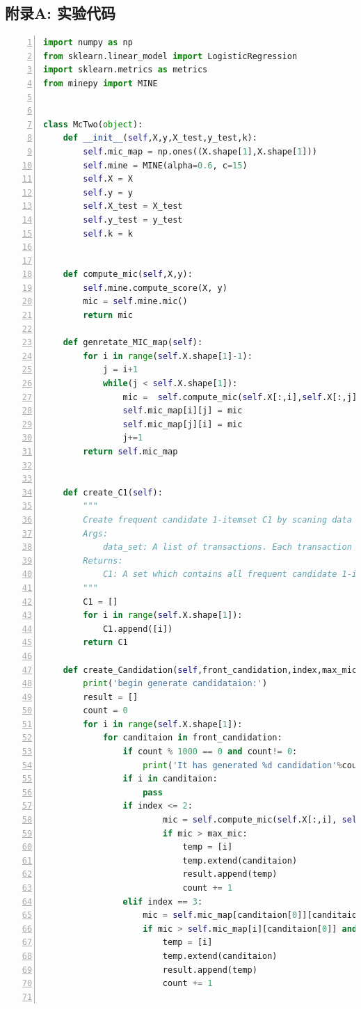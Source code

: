 \documentclass{njubachelor}
\begin{document}
\subsection{附录A: 实验代码}
\begin{lstlisting}[language=python,numbers=left]
import numpy as np
from sklearn.linear_model import LogisticRegression
import sklearn.metrics as metrics
from minepy import MINE


class McTwo(object):
    def __init__(self,X,y,X_test,y_test,k):
        self.mic_map = np.ones((X.shape[1],X.shape[1]))
        self.mine = MINE(alpha=0.6, c=15)
        self.X = X
        self.y = y
        self.X_test = X_test
        self.y_test = y_test
        self.k = k


    def compute_mic(self,X,y):
        self.mine.compute_score(X, y)
        mic = self.mine.mic()
        return mic

    def genretate_MIC_map(self):
        for i in range(self.X.shape[1]-1):
            j = i+1
            while(j < self.X.shape[1]):
                mic =  self.compute_mic(self.X[:,i],self.X[:,j])
                self.mic_map[i][j] = mic
                self.mic_map[j][i] = mic
                j+=1
        return self.mic_map


    def create_C1(self):
        """
        Create frequent candidate 1-itemset C1 by scaning data set.
        Args:
            data_set: A list of transactions. Each transaction contains several items.
        Returns:
            C1: A set which contains all frequent candidate 1-itemsets
        """
        C1 = []
        for i in range(self.X.shape[1]):
            C1.append([i])
        return C1

    def create_Candidation(self,front_candidation,index,max_mic=0.15):
        print('begin generate candidataion:')
        result = []
        count = 0
        for i in range(self.X.shape[1]):
            for canditaion in front_candidation:
                if count % 1000 == 0 and count!= 0:
                    print('It has generated %d candidation'%count)
                if i in canditaion:
                    pass
                if index <= 2:
                        mic = self.compute_mic(self.X[:,i], self.y)
                        if mic > max_mic:
                            temp = [i]
                            temp.extend(canditaion)
                            result.append(temp)
                            count += 1
                elif index == 3:
                    mic = self.mic_map[canditaion[0]][canditaion[1]]
                    if mic > self.mic_map[i][canditaion[0]] and mic > self.mic_map[i][canditaion[1]]:
                        temp = [i]
                        temp.extend(canditaion)
                        result.append(temp)
                        count += 1


\end{lstlisting}
\end{document}
